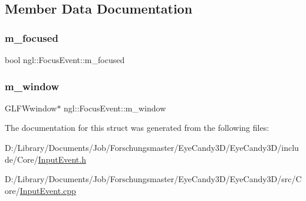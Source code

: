 \subsection{Member Data Documentation}
\mbox{\label{structngl_1_1_focus_event_adf1661904c5d4163ebcf668173173670}} 
\subsubsection{\texorpdfstring{m\+\_\+focused}{m\_focused}}
{\footnotesize\ttfamily bool ngl\+::\+Focus\+Event\+::m\+\_\+focused}

\mbox{\label{structngl_1_1_focus_event_af35e9d9e95feaef37a7f214bab4c2fb8}} 
\subsubsection{\texorpdfstring{m\+\_\+window}{m\_window}}
{\footnotesize\ttfamily G\+L\+F\+Wwindow$\ast$ ngl\+::\+Focus\+Event\+::m\+\_\+window}



The documentation for this struct was generated from the following files\+:\begin{DoxyCompactItemize}
\item 
D\+:/\+Library/\+Documents/\+Job/\+Forschungsmaster/\+Eye\+Candy3\+D/\+Eye\+Candy3\+D/include/\+Core/\mbox{\hyperlink{_input_event_8h}{Input\+Event.\+h}}\item 
D\+:/\+Library/\+Documents/\+Job/\+Forschungsmaster/\+Eye\+Candy3\+D/\+Eye\+Candy3\+D/src/\+Core/\mbox{\hyperlink{_input_event_8cpp}{Input\+Event.\+cpp}}\end{DoxyCompactItemize}

